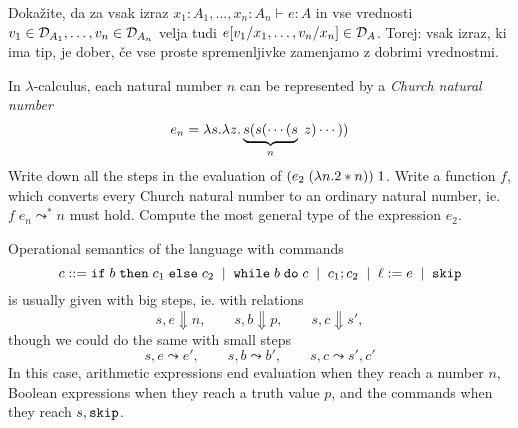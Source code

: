 \documentclass[arhiv]{../izpit}
\begin{document}
\podnaloga
Dokažite, da za vsak izraz $x_1 : A_1, \dots, x_n : A_n \vdash e : A$ in vse vrednosti $v_1 \in \mathcal{D}_{A_1}, \dots, v_n \in \mathcal{D}_{A_n}$ velja tudi $e[v_1 / x_1, \dots, v_n / x_n] \in \mathcal{D}_{A}$. Torej: vsak izraz, ki ima tip, je dober, če vse proste spremenljivke zamenjamo z dobrimi vrednostmi.

\nadaljevanje




\naloga[\tocke{20}]
In $\lambda$-calculus, each natural number $n$ can be represented by a \emph{Church natural number}
\[
  e_n = \lambda s. \lambda z. \underbrace{s (s (\cdots (s}_n \; z) \cdots))
\]
\podnaloga Write down all the steps in the evaluation of $(e_2 \; (\lambda n. 2 * n)) \; 1$.
\podnaloga Write a function $f$, which converts every Church natural number to an ordinary natural number, ie. $f \; e_n \leadsto^* n$ must hold.
\podnaloga Compute the most general type of the expression $e_2$.
\nadaljevanje

\naloga[\tocke{20}]
Operational semantics of the {\imp} language with commands
\[
  c \mathrel{{:}{:}{=}}
  \mathtt{if}\;b\;\mathtt{then}\;c_1\;\mathtt{else}\;c_2 \;\mid\;
  \mathtt{while}\;b\;\mathtt{do}\;c \;\mid\;
  c_1; c_2 \;\mid\;
  \ell := e \;\mid\;
  \mathtt{skip}
\]
is usually given with big steps, ie. with relations
\[
  s, e \Downarrow n, \qquad s, b \Downarrow p, \qquad s, c \Downarrow s',
\]
though we could do the same with small steps
\[
  s, e \leadsto e', \qquad s, b \leadsto b', \qquad s, c \leadsto s', c'
\]
In this case, arithmetic expressions end evaluation when they reach a number $n$, Boolean expressions when they reach a truth value $p$, and the commands when they reach $s, \mathtt{skip}$.
\end{document}
